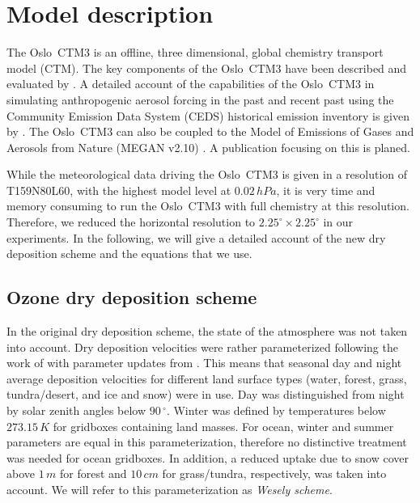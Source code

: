 \documentclass[gmd, manuscript]{copernicus}
\begin{document}
\section{Model description}
\label{sec:model_des}
The Oslo~CTM3 is an offline, three dimensional, global chemistry transport model (CTM). The key components of the Oslo~CTM3 have been described and evaluated by \citet{GMD:Sovde2012}. A detailed account of the capabilities of the Oslo~CTM3 in simulating anthropogenic aerosol forcing in the past and recent past using the Community Emission Data System (CEDS) historical emission inventory \citep{GMD:Hoesly2018} is given by \citet{GMD:Lund2018}. The Oslo~CTM3 can also be coupled to the Model of Emissions of Gases and Aerosols from Nature (MEGAN v2.10) \citep{ACP:Guenther2006}. A publication focusing on this is planed.

While the meteorological data driving the Oslo~CTM3 is given in a resolution of T159N80L60, with the highest model level at $0.02\,\unit{hPa}$, it is very time and memory consuming to run the Oslo~CTM3 with full chemistry at this resolution. Therefore, we reduced the horizontal resolution to $2.25^\circ\times2.25^\circ$ in our experiments. In the following, we will give a detailed account of the new dry deposition scheme and the equations that we use.
\subsection{Ozone dry deposition scheme}
\label{subsec:DryDep}
In the original dry deposition scheme, the state of the atmosphere was not taken into account. Dry deposition velocities were rather parameterized following the work of \citet{AE:Wesely1989} with parameter updates from \citet{JGR:Hough1991}. This means that seasonal day and night average deposition velocities for different land surface types (water, forest, grass, tundra/desert, and ice and snow) were in use. Day was distinguished from night by solar zenith angles below $90\,\unit{^\circ}$. Winter was defined by temperatures below $273.15\,\unit{K}$ for gridboxes containing land masses. For ocean, winter and summer parameters are equal in this parameterization, therefore no distinctive treatment was needed for ocean gridboxes. In addition, a reduced uptake due to snow cover above $1\,\unit{m}$ for forest and $10\,\unit{cm}$ for grass/tundra, respectively, was taken into account. We will refer to this parameterization as \emph{Wesely scheme}.\\
\end{document}

